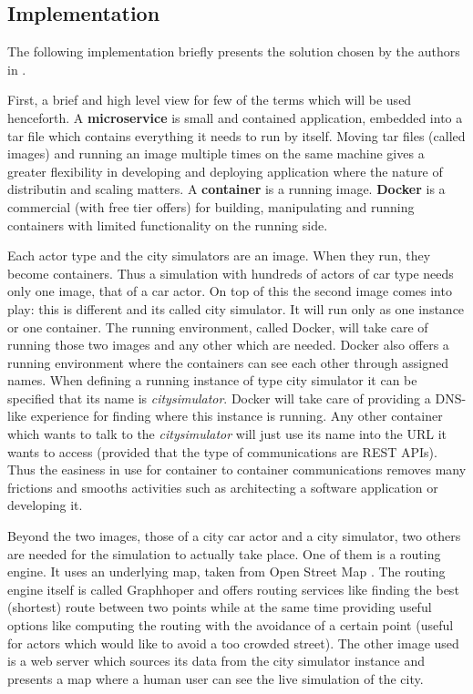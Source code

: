 \documentclass[a4paper,12pt,twoside]{book}
\begin{document}
\subsection{Implementation}

The following implementation briefly presents the solution chosen by the authors in \cite{microservicestrafficsimulation}.

First, a brief and high level view for few of the terms which will be used henceforth. A \textbf{microservice} is small and contained application, embedded into a tar file which contains everything it needs to run by itself. Moving tar files (called images) and running an image multiple times on the same machine gives a greater flexibility in developing and deploying application where the nature of distributin and scaling matters. A \textbf{container} is a running image. \textbf{Docker} \citep{docker} is a commercial (with free tier offers) for building, manipulating and running containers with limited functionality on the running side.

Each actor type and the city simulators are an image. When they run, they become containers. Thus a simulation with hundreds of actors of car type needs only one image, that of a car actor. On top of this the second image comes into play: this is different and its called city simulator. It will run only as one instance or one container. The running environment, called Docker, will take care of running those two images and any other which are needed. Docker also offers a running environment where the containers can see each other through assigned names. When defining a running instance of type city simulator it can be specified that its name is \textit{citysimulator}. Docker will take care of providing a DNS-like experience for finding where this instance is running. Any other container which wants to talk to the \textit{citysimulator} will just use its name into the URL it wants to access (provided that the type of communications are REST APIs). Thus the easiness in use for container to container communications removes many frictions and smooths activities such as architecting a software application or developing it.

Beyond the two images, those of a city car actor and a city simulator, two others are needed for the simulation to actually take place. One of them is a routing engine. It uses an underlying map, taken from Open Street Map \citep{openstreetmap}. The routing engine itself is called Graphhoper \citep{graphhopper} and offers routing services like finding the best (shortest) route between two points while at the same time providing useful options like computing the routing with the avoidance of a certain point (useful for actors which would like to avoid a too crowded street). The other image used is a web server which sources its data from the city simulator instance and presents a map where a human user can see the live simulation of the city.
\end{document}
